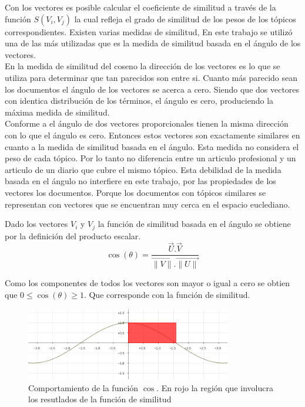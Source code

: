 Con los vectores es posible calcular el coeficiente de similitud a través de la función $ S (V_i, V_j)$ la cual refleja el grado de similitud de los pesos de los tópicos correspondientes. Existen varias medidas de similitud, En este trabajo se utilizó una de las más utilizadas que es la medida de similitud basada en el ángulo de los vectores.\\
En la medida de similitud del coseno la dirección de los vectores es lo que se utiliza para determinar que tan parecidos son entre si. Cuanto más parecido sean los documentos el ángulo de los vectores se acerca a cero. Siendo que dos vectores con identica distribución de los términos, el ángulo es cero, produciendo la máxima medida de similitud.\\
Conforme a \cite{newSimilarity} el ángulo de dos vectores proporcionales tienen la misma dirección con lo que el ángulo es cero. Entonces estos vectores son exactamente similares en cuanto a la medida de similitud basada en el ángulo. Esta medida no considera el peso de cada tópico. Por lo tanto no diferencia entre un articulo profesional y un articulo de un diario que cubre el mismo tópico. Esta debilidad de la medida basada en el ángulo no interfiere en este trabajo, por las propiedades de los vectores los documentos. Porque los documentos con tópicos similares se representan con vectores que se encuentran muy cerca en el espacio euclediano.

Dado los vectores $V_i$ y $V_j$ la función de similitud basada en el ángulo se obtiene por la definición del producto escalar.\\
\begin{equation} \label{eq:angulovectorial}
\cos(\theta) =  \dfrac{\overrightarrow{U} . \overrightarrow{V}}{\overrightarrow{\lVert V\lVert}.\overrightarrow{\lVert U\lVert}}
\end{equation}

Como los componentes de todos los vectores son mayor o igual a cero se obtien que $0\leq\cos(\theta)\geq1$. Que corresponde con la función de similitud.

\begin{figure}[H]
\includegraphics[width=0.8\textwidth]{img/coseno.png}
\caption{Comportamiento de la función $\cos$. En rojo la región que involucra los resutlados de la función de similitud}
\label{bus:img-coseno}
\end{figure}


